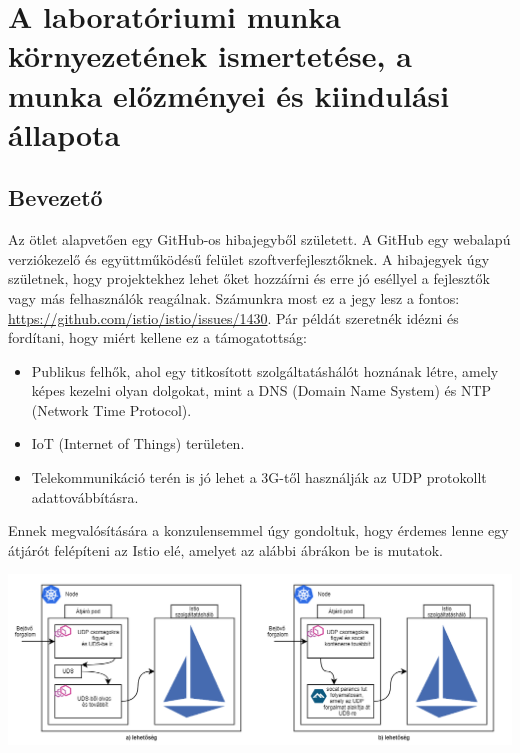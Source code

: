 \documentclass[a4paper,oneside]{article}
\begin{document}
\begin{titlepage}
 
  
 
\end{titlepage} 

\section{A laboratóriumi munka környezetének ismertetése,
     a munka előzményei és kiindulási állapota}
\label{sec:kornyezet}
\subsection{Bevezető}
\label{sec:bevezeto}
Az ötlet alapvetően egy GitHub-os hibajegyből született. A GitHub egy 
webalapú verziókezelő és együttműködésű felület szoftverfejlesztőknek. 
A hibajegyek úgy születnek, hogy projektekhez lehet őket hozzáírni és erre jó 
eséllyel a fejlesztők vagy más felhasználók reagálnak. Számunkra most ez a jegy 
lesz a fontos: \url{https://github.com/istio/istio/issues/1430}. Pár példát szeretnék 
idézni és fordítani, hogy miért kellene ez a támogatottság: 
\begin{itemize}
	\item  Publikus felhők, ahol egy titkosított szolgáltatáshálót hoznának létre, amely 
	képes kezelni olyan dolgokat, mint a DNS (Domain Name System) és NTP (Network Time Protocol).
	\item IoT (Internet of Things) területen.
	\item Telekommunikáció terén is jó lehet a 3G-től használják az UDP protokollt adattovábbításra. 
\end{itemize}
Ennek megvalósítására a konzulensemmel úgy gondoltuk, hogy érdemes lenne 
egy átjárót felépíteni az Istio elé, amelyet az alábbi ábrákon be is mutatok. 
\begin{center}
\includegraphics[width=\textwidth]{teljes_architektura}
\end{center}
\end{document}
